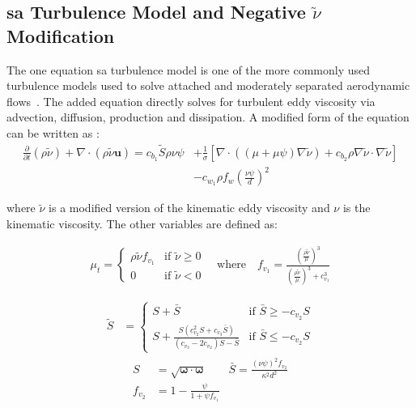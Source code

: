 \subsection{\gls{sa} Turbulence Model and Negative $\tilde\nu$ Modification}

The one equation \gls{sa} turbulence model is one of the more commonly used turbulence models used to solve attached and moderately separated aerodynamic flows~\cite{spalart1992one}. The added equation directly solves for turbulent eddy viscosity via advection, diffusion, production and dissipation. A modified form of the equation can be written as \cite{burgess2012robust,oliver2008high,moro2011navier}:
\begin{equation}
\begin{split}
	\frac{\partial}{\partial t}(\rho\tilde\nu) + \nabla\cdot(\rho\tilde\nu\boldsymbol{u}) = c_{b_1}\tilde S \rho\nu\psi &+ \frac{1}{\sigma}\left[\nabla\cdot((\mu + \mu\psi)\nabla\tilde\nu) + c_{b_2}\rho\nabla\tilde\nu\cdot\nabla\tilde\nu\right] \\&- c_{w_1}\rho f_w \left(\frac{\nu\psi}{d}\right)^2
\end{split}
\end{equation}

where $\tilde\nu$ is a modified version of the kinematic eddy viscosity and $\nu$ is the kinematic viscosity. The other variables are defined as:

\begin{align}
	 \mu_t =
	  \begin{cases}
	   \rho\tilde\nu f_{v_1} & \text{if } \tilde\nu \ge 0 \\
	   0       & \text{if } \tilde\nu < 0
	  \end{cases}
	  \quad \mbox{where} \quad f_{v_1} = \frac{\left(\frac{\rho\tilde\nu}{\mu}\right)^3}{\left(\frac{\rho\tilde\nu}{\mu}\right)^3 + c_{v_1}^3}
\end{align}

\begin{align}
	\tilde S &=
	\begin{cases}
	   S + \bar S & \text{if } \bar S \ge -c_{v_2}S \\
	   S + \frac{S(c_{v_2}^2 S + c_{v_3}\bar S)}{(c_{v_3} - 2c_{v_2})S - \bar S} & \text{if } \bar S \le -c_{v_2}S
	\end{cases}
\end{align}
\begin{align}
	S &= \sqrt{\boldsymbol{\omega}\cdot\boldsymbol{\omega}}
	\qquad \bar S = \frac{(\nu\psi)^2 f_{v_2}}{\kappa^2 d^2} \\
	f_{v_2} &= 1 - \frac{\psi}{1 + \psi f_{v_1}}
\end{align}

